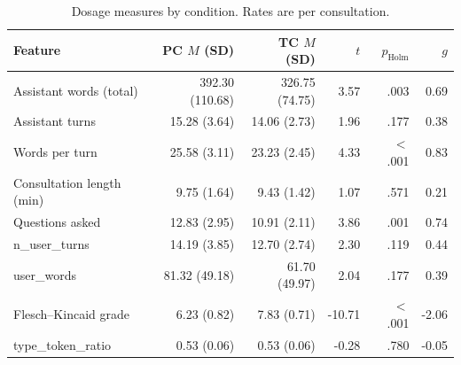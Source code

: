 \begin{table}[t]
\centering
\small
\begin{tabular}{lrrrrr}
\toprule
Feature & PC $M$ (SD) & TC $M$ (SD) & $t$ & $p_{\text{Holm}}$ & $g$ \\
\midrule
Assistant words (total) & 392.30 (110.68) & 326.75 (74.75) & 3.57 & .003 & 0.69 \\
Assistant turns & 15.28 (3.64) & 14.06 (2.73) & 1.96 & .177 & 0.38 \\
Words per turn & 25.58 (3.11) & 23.23 (2.45) & 4.33 & $<$.001 & 0.83 \\
Consultation length (min) & 9.75 (1.64) & 9.43 (1.42) & 1.07 & .571 & 0.21 \\
Questions asked & 12.83 (2.95) & 10.91 (2.11) & 3.86 & .001 & 0.74 \\
n\_user\_turns & 14.19 (3.85) & 12.70 (2.74) & 2.30 & .119 & 0.44 \\
user\_words & 81.32 (49.18) & 61.70 (49.97) & 2.04 & .177 & 0.39 \\
Flesch--Kincaid grade & 6.23 (0.82) & 7.83 (0.71) & -10.71 & $<$.001 & -2.06 \\
type\_token\_ratio & 0.53 (0.06) & 0.53 (0.06) & -0.28 & .780 & -0.05 \\
\bottomrule
\end{tabular}
\caption{Dosage measures by condition. Rates are per consultation.}
\label{tab:dosage}
\end{table}

